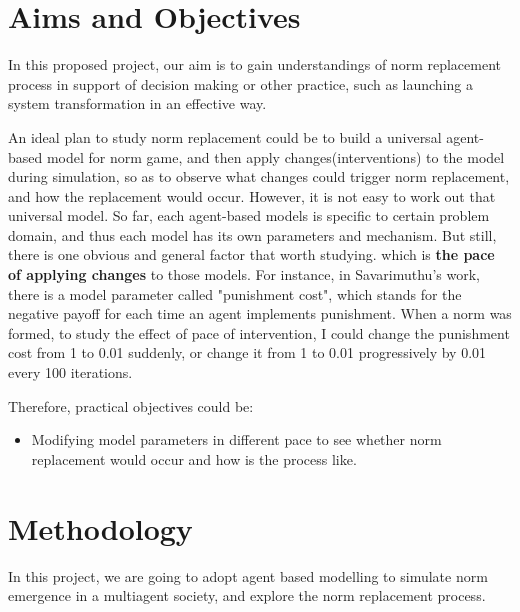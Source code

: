 \documentclass[12pt]{extarticle}
\begin{document}
\section{Aims and Objectives}
In this proposed project, our aim is to gain understandings of norm replacement process in support of decision making or other practice, such as launching a system transformation in an effective way.

An ideal plan to study norm replacement could be to build a universal agent-based model for norm game, and then apply changes(interventions) to the model during simulation, so as to observe what changes could trigger norm replacement, and how the replacement would occur. However, it is not easy to work out that universal model. So far, each agent-based models is specific to certain problem domain, and thus each model has its own parameters and mechanism. But still, there is one obvious and general factor that worth studying. which is \textbf{the pace of applying changes} to those models. For instance, in Savarimuthu's work\cite{Savarimuthu2011}, there is a model parameter called "punishment cost", which stands for the negative payoff for each time an agent implements punishment. When a norm was formed, to study the effect of pace of intervention, I could change the punishment cost from 1 to 0.01 suddenly, or change it from 1 to 0.01 progressively by 0.01 every 100 iterations.

Therefore, practical objectives could be: 

\begin{itemize}

\item Modifying model parameters in different pace to see whether norm replacement would occur and how is the process like.
\end{itemize}


\section{Methodology}
In this project, we are going to adopt agent based modelling to simulate norm emergence in a multiagent society, and explore the norm replacement process.
\end{document}
